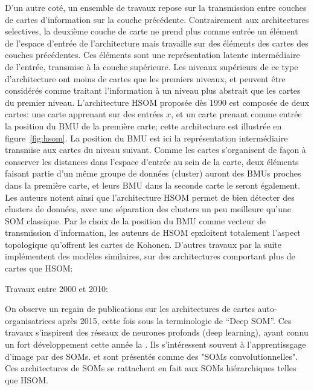 \documentclass[../main]{subfiles}
\begin{document}
D'un autre coté, un ensemble de travaux repose sur la transmission entre couches de cartes d'information sur la couche précédente. Contrairement aux architectures selectives, la deuxième couche de carte ne prend plus comme entrée un élément de l'espace d'entrée de l'architecture mais travaille sur des éléments des cartes des couches précédentes.
Ces éléments sont une représentation latente intermédiaire de l'entrée, transmise à la couche supérieure. Les niveaux supérieurs de ce type d'architecture ont moins de cartes que les premiers niveaux, et peuvent être considérés comme traitant l'information à un niveau plus abstrait que les cartes du premier niveau.
L'architecture  HSOM \cite{lampinen_clustering_1992} proposée dès 1990 est composée de deux cartes: une carte apprenant sur des entrées $x$, et un carte prenant comme entrée la position du BMU de la première carte; cette architecture est illustrée en figure~\ref{fig:hsom}. La position du BMU est ici la représentation intermédiaire transmise aux cartes du niveau suivant.
Comme les cartes s'organisent de façon à conserver les distances dans l'espace d'entrée au sein de la carte, deux éléments faisant partie d'un même groupe de données (cluster) auront des BMUs proches dans la première carte, et leurs BMU dans la seconde carte le seront également. Les auteurs notent ainsi que l'architecture HSOM permet de bien détecter des clusters de données, avec une séparation des clusters un peu meilleure qu'une SOM classique.
Par le choix de la position du BMU comme vecteur de transmission d'information, les auteurs de HSOM epxloitent totalement l'aspect topologique qu'offrent les cartes de Kohonen. D'autres travaux par la suite implémentent des modèles similaires, sur des architectures comportant plus de cartes que HSOM: \cite{hagenauer_hierarchical_2013}


Travaux entre 2000 et 2010:
\cite{dittenbach_growing_2000,yamaguchi_adaptive_2010,gunes_kayacik_hierarchical_2007,wang_comparisonal_2007}

On observe un regain de publications sur les architectures de cartes auto-organisatrices après 2015, cette fois sous la terminologie de “Deep SOM”. 
Ces travaux s'inspirent des réseaux de neurones profonds (deep learning), ayant connu un fort développement cette année la \cite{lecun_deep_2015}. Ils s'intéressent souvent à l'apprentissgage d'image par des SOMs. \cite{Liu2015DeepSM,hankins_somnet_2018,wickramasinghe_deep_2019,aly_deep_2020,sakkari_convolutional_2020,dozono_convolutional_2016,nawaratne_hierarchical_2020,mici_self-organizing_2018} et sont présentés comme des "SOMs convolutionnelles". Ces architectures de SOMs se rattachent en fait aux SOMs hiérarchiques telles que HSOM.
\end{document}
